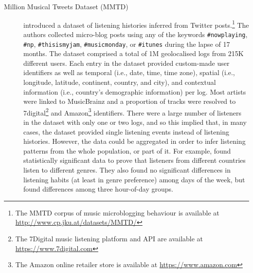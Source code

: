 \begin{description}
\item [Million Musical Tweets Dataset (MMTD)] \textcite{hauger13million} introduced a dataset of listening histories inferred from Twitter posts.\footnote{The MMTD corpus of music microblogging behaviour is available at \url{http://www.cp.jku.at/datasets/MMTD/}} The authors collected micro-blog posts using any of the keywords \texttt{\#nowplaying}, \texttt{\#np}, \texttt{\#thisismyjam}, \texttt{\#musicmonday}, or \texttt{\#itunes} during the lapse of 17 months.
The dataset comprised a total of 1M geolocalised logs from 215K different users. Each entry in the dataset provided custom-made user identifiers as well as temporal (i.e., date, time, time zone), spatial (i.e., longitude, latitude, continent, country, and city), and contextual information (i.e., country's demographic information) per log. Most artists were linked to MusicBrainz and a proportion of tracks were resolved to 7digital\footnote{The 7Digital music listening platform and API are available at \url{https://www.7digital.com}} and Amazon\footnote{The Amazon online retailer store is available at \url{https://www.amazon.com}} identifiers.
There were a large number of listeners in the dataset with only one or two logs, and so this implied that, in many cases, the dataset provided single listening events instead of listening histories.
However, the data could be aggregated in order to infer listening patterns from the whole population, or part of it.
For example, \citeauthor{hauger13million} found statistically significant data to prove that listeners from different countries listen to different genres. They also found no significant differences in listening habits (at least in genre preference) among days of the week, but found differences among three hour-of-day groups.



\end{description}
